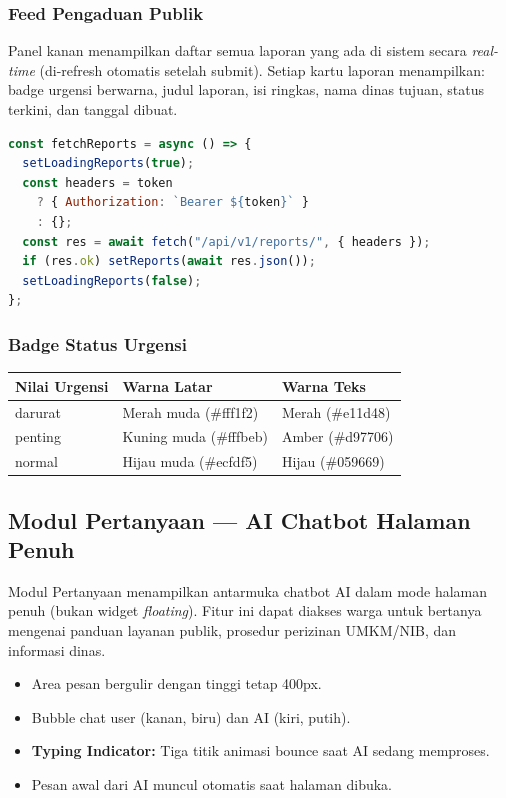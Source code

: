 \documentclass[12pt,a4paper]{article}
\begin{document}
\subsubsection{Feed Pengaduan Publik}

Panel kanan menampilkan daftar semua laporan yang ada di sistem secara \textit{real-time}
(di-refresh otomatis setelah submit). Setiap kartu laporan menampilkan:
badge urgensi berwarna, judul laporan, isi ringkas, nama dinas tujuan, status terkini,
dan tanggal dibuat.

\begin{lstlisting}[language=JavaScript, caption=Fetch laporan dari API]
const fetchReports = async () => {
  setLoadingReports(true);
  const headers = token
    ? { Authorization: `Bearer ${token}` }
    : {};
  const res = await fetch("/api/v1/reports/", { headers });
  if (res.ok) setReports(await res.json());
  setLoadingReports(false);
};
\end{lstlisting}

\subsubsection{Badge Status Urgensi}

\begin{center}
\begin{tabular}{lll}
  \toprule
  \textbf{Nilai Urgensi} & \textbf{Warna Latar} & \textbf{Warna Teks} \\
  \midrule
  darurat & Merah muda (\#fff1f2) & Merah (\#e11d48) \\
  penting & Kuning muda (\#fffbeb) & Amber (\#d97706) \\
  normal  & Hijau muda (\#ecfdf5) & Hijau (\#059669) \\
  \bottomrule
\end{tabular}
\end{center}

\subsection{Modul Pertanyaan --- AI Chatbot Halaman Penuh}

Modul Pertanyaan menampilkan antarmuka chatbot AI dalam mode halaman penuh
(bukan widget \textit{floating}). Fitur ini dapat diakses warga untuk bertanya
mengenai panduan layanan publik, prosedur perizinan UMKM/NIB, dan informasi dinas.

\begin{itemize}[leftmargin=2em, itemsep=4pt]
  \item Area pesan bergulir dengan tinggi tetap 400px.
  \item Bubble chat user (kanan, biru) dan AI (kiri, putih).
  \item \textbf{Typing Indicator:} Tiga titik animasi bounce saat AI sedang memproses.
  \item Pesan awal dari AI muncul otomatis saat halaman dibuka.
\end{itemize}
\end{document}
